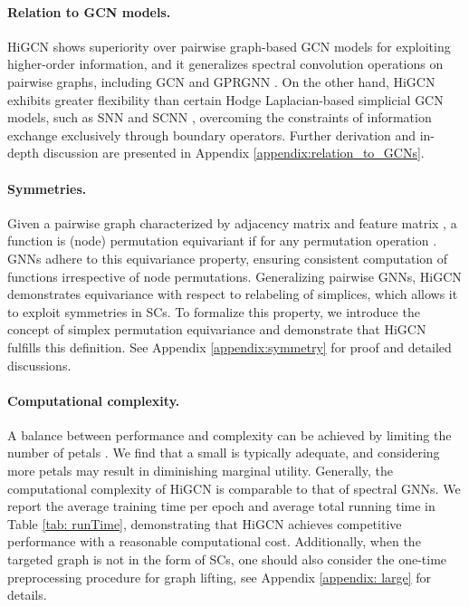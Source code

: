 \documentclass[letterpaper]{article} \usepackage{aaai24}
\theoremstyle{plain}
\theoremstyle{definition}
\theoremstyle{remark}
\begin{document}
\paragraph{Relation to GCN models.}


HiGCN shows superiority over pairwise graph-based GCN models for exploiting higher-order information, and it generalizes spectral convolution operations on pairwise graphs, including GCN \cite{GCN} and GPRGNN \cite{GPRGNN}.
On the other hand, HiGCN exhibits greater flexibility than certain Hodge Laplacian-based simplicial GCN models, such as SNN \cite{SNN2020} and SCNN \cite{SCNN2022}, overcoming the constraints of information exchange exclusively through boundary operators.
Further derivation and in-depth discussion are presented in Appendix \ref{appendix:relation_to_GCNs}.





\paragraph{Symmetries.}
Given a pairwise graph  characterized by adjacency matrix  and feature matrix , a function  is (node) permutation equivariant if  for any permutation operation . 
GNNs adhere to this equivariance property, ensuring consistent computation of functions irrespective of node permutations.
Generalizing pairwise GNNs, HiGCN demonstrates equivariance with respect to relabeling of simplices, which allows it to exploit symmetries in SCs. 
To formalize this property, we introduce the concept of simplex permutation equivariance and demonstrate that HiGCN fulfills this definition. See Appendix  \ref{appendix:symmetry} for proof and detailed discussions.






\paragraph{Computational complexity.}
A balance between performance and complexity can be achieved by limiting the number of petals . We find that a small  is typically adequate, and considering more petals may result in diminishing marginal utility.
Generally, the computational complexity of HiGCN is comparable to that of spectral GNNs. 
We report the average training time per epoch and average total running time in Table \ref{tab: runTime}, demonstrating that HiGCN achieves competitive performance with a reasonable computational cost.
Additionally, when the targeted graph is not in the form of SCs, one should also consider the one-time preprocessing procedure for graph lifting, see Appendix \ref{appendix: large} for details. 
\end{document}
